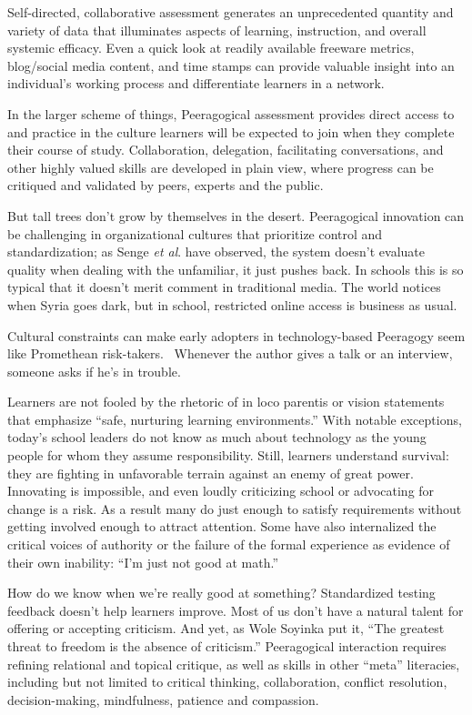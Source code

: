 Self-directed, collaborative assessment generates an unprecedented
quantity and variety of data that illuminates aspects of learning,
instruction, and overall systemic efficacy. Even a quick look at readily
available freeware metrics, blog/social media content, and time stamps
can provide valuable insight into an individual's working process and
differentiate learners in a network.

In the larger scheme of things, Peeragogical assessment provides direct
access to and practice in the culture learners will be expected to join
when they complete their course of study. Collaboration, delegation,
facilitating conversations, and other highly valued skills are developed
in plain view, where progress can be critiqued and validated by peers,
experts and the public.

But tall trees don't grow by themselves in the desert. Peeragogical
innovation can be challenging in organizational cultures that prioritize
control and standardization; as Senge \emph{et al}. have observed, the
system doesn't evaluate quality when dealing with the unfamiliar, it
just pushes back. In schools this is so typical that it doesn't merit
comment in traditional media. The world notices when Syria goes dark,
but in school, restricted online access is business as usual.

Cultural constraints can make early adopters in technology-based
Peeragogy seem like Promethean risk-takers.~ Whenever the author gives a
talk or an interview, someone asks if he's in trouble.

Learners are not fooled by the rhetoric of in loco parentis or vision
statements that emphasize ``safe, nurturing learning environments.''
With notable exceptions, today's school leaders do not know as much
about technology as the young people for whom they assume
responsibility. Still, learners understand survival: they are fighting
in unfavorable terrain against an enemy of great power. Innovating is
impossible, and even loudly criticizing school or advocating for change
is a risk. As a result many do just enough to satisfy requirements
without getting involved enough to attract attention. Some have also
internalized the critical voices of authority or the failure of the
formal experience as evidence of their own inability: ``I'm just not
good at math.''

How do we know when we're really good at something? Standardized testing
feedback doesn't help learners improve. Most of us don't have a natural
talent for offering or accepting criticism. And yet, as Wole Soyinka put
it, ``The greatest threat to freedom is the absence of criticism.''
Peeragogical interaction requires refining relational and topical
critique, as well as skills in other ``meta'' literacies, including but
not limited to critical thinking, collaboration, conflict resolution,
decision-making, mindfulness, patience and compassion.

